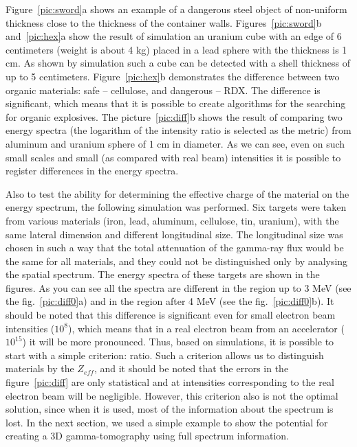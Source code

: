\documentclass[a4paper]{panl}
\begin{document}
Figure~\ref{pic:sword}a shows an example of a dangerous steel object of non-uniform thickness close to the thickness of the container walls. Figures~\ref{pic:sword}b and~\ref{pic:hex}a show the result of simulation an uranium cube with an edge of 6 centimeters (weight is about 4 kg) placed in a lead sphere with the thickness is 1 cm. As shown by simulation such a cube can be detected with a shell thickness of up to 5 centimeters. Figure~\ref{pic:hex}b demonstrates the difference between two organic materials: safe -- cellulose, and dangerous -- RDX. The difference is significant, which means that it is possible to create algorithms for the searching for organic explosives. The picture~\ref{pic:diff}b shows the result of comparing two energy spectra (the logarithm of the intensity ratio is selected as the metric) from aluminum and uranium sphere of 1 cm in diameter. As we can see, even on such small scales and small (as compared with real beam) intensities it is possible to register differences in the energy spectra.

Also to test the ability for determining the effective charge of the material on the energy spectrum, the following simulation was performed. Six targets were taken from various materials (iron, lead, aluminum, cellulose, tin, uranium), with the same lateral dimension and different longitudinal size. The longitudinal size was chosen in such a way that the total attenuation of the gamma-ray flux would be the same for all materials, and they could not be distinguished only by analysing the spatial spectrum.
The energy spectra of these targets are shown in the figures. As you can see all the spectra are different in the region up to 3 MeV (see the fig.~\ref{pic:diff0}a) and in the region after 4 MeV (see the fig.~\ref{pic:diff0}b). It should be noted that this difference is significant even for small electron beam intensities ($10^8$), which means that in a real electron beam from an accelerator ($10^{15}$) it will be more pronounced. Thus, based on simulations, it is possible to start with a simple criterion: ratio. Such a criterion allows us to distinguish materials by the $Z_{eff}$, and it should be noted that the errors in the figure~\ref{pic:diff} are only statistical and at intensities corresponding to the real electron beam will be negligible. However, this criterion also is not the optimal solution, since when it is used, most of the information about the spectrum is lost. In the next section, we used a simple example to show the potential for creating a 3D gamma-tomography using full spectrum information.
\end{document}

